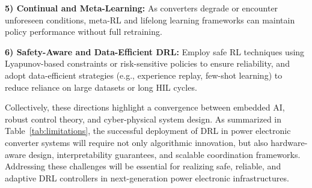\textbf{5) Continual and Meta-Learning:} As converters degrade or encounter unforeseen conditions, meta-RL and lifelong learning frameworks can maintain policy performance without full retraining.

\textbf{6) Safety-Aware and Data-Efficient DRL:} Employ safe RL techniques using Lyapunov-based constraints or risk-sensitive policies to ensure reliability, and adopt data-efficient strategies (e.g., experience replay, few-shot learning) to reduce reliance on large datasets or long HIL cycles.

Collectively, these directions highlight a convergence between embedded AI, robust control theory, and cyber-physical system design. As summarized in Table~\ref{tab:limitations}, the successful deployment of DRL in power electronic converter systems will require not only algorithmic innovation, but also hardware-aware design, interpretability guarantees, and scalable coordination frameworks. Addressing these challenges will be essential for realizing safe, reliable, and adaptive DRL controllers in next-generation power electronic infrastructures.
